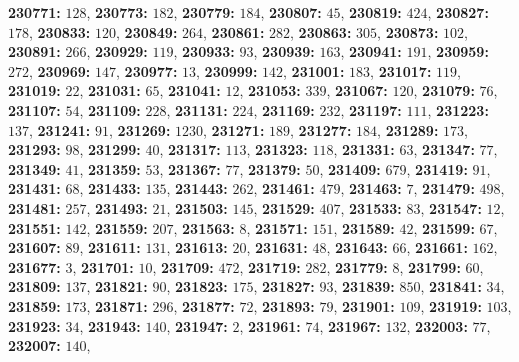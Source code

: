 \textsf{\bfseries 230771:} $128$, \textsf{\bfseries 230773:} $182$, \textsf{\bfseries 230779:} $184$, \textsf{\bfseries 230807:} $45$, \textsf{\bfseries 230819:} $424$, \textsf{\bfseries 230827:} $178$, \textsf{\bfseries 230833:} $120$, \textsf{\bfseries 230849:} $264$, \textsf{\bfseries 230861:} $282$, \textsf{\bfseries 230863:} $305$, \textsf{\bfseries 230873:} $102$, \textsf{\bfseries 230891:} $266$, \textsf{\bfseries 230929:} $119$, \textsf{\bfseries 230933:} $93$, \textsf{\bfseries 230939:} $163$, \textsf{\bfseries 230941:} $191$, \textsf{\bfseries 230959:} $272$, \textsf{\bfseries 230969:} $147$, \textsf{\bfseries 230977:} $13$, \textsf{\bfseries 230999:} $142$, \textsf{\bfseries 231001:} $183$, \textsf{\bfseries 231017:} $119$, \textsf{\bfseries 231019:} $22$, \textsf{\bfseries 231031:} $65$, \textsf{\bfseries 231041:} $12$, \textsf{\bfseries 231053:} $339$, \textsf{\bfseries 231067:} $120$, \textsf{\bfseries 231079:} $76$, \textsf{\bfseries 231107:} $54$, \textsf{\bfseries 231109:} $228$, \textsf{\bfseries 231131:} $224$, \textsf{\bfseries 231169:} $232$, \textsf{\bfseries 231197:} $111$, \textsf{\bfseries 231223:} $137$, \textsf{\bfseries 231241:} $91$, \textsf{\bfseries 231269:} $1230$, \textsf{\bfseries 231271:} $189$, \textsf{\bfseries 231277:} $184$, \textsf{\bfseries 231289:} $173$, \textsf{\bfseries 231293:} $98$, \textsf{\bfseries 231299:} $40$, \textsf{\bfseries 231317:} $113$, \textsf{\bfseries 231323:} $118$, \textsf{\bfseries 231331:} $63$, \textsf{\bfseries 231347:} $77$, \textsf{\bfseries 231349:} $41$, \textsf{\bfseries 231359:} $53$, \textsf{\bfseries 231367:} $77$, \textsf{\bfseries 231379:} $50$, \textsf{\bfseries 231409:} $679$, \textsf{\bfseries 231419:} $91$, \textsf{\bfseries 231431:} $68$, \textsf{\bfseries 231433:} $135$, \textsf{\bfseries 231443:} $262$, \textsf{\bfseries 231461:} $479$, \textsf{\bfseries 231463:} $7$, \textsf{\bfseries 231479:} $498$, \textsf{\bfseries 231481:} $257$, \textsf{\bfseries 231493:} $21$, \textsf{\bfseries 231503:} $145$, \textsf{\bfseries 231529:} $407$, \textsf{\bfseries 231533:} $83$, \textsf{\bfseries 231547:} $12$, \textsf{\bfseries 231551:} $142$, \textsf{\bfseries 231559:} $207$, \textsf{\bfseries 231563:} $8$, \textsf{\bfseries 231571:} $151$, \textsf{\bfseries 231589:} $42$, \textsf{\bfseries 231599:} $67$, \textsf{\bfseries 231607:} $89$, \textsf{\bfseries 231611:} $131$, \textsf{\bfseries 231613:} $20$, \textsf{\bfseries 231631:} $48$, \textsf{\bfseries 231643:} $66$, \textsf{\bfseries 231661:} $162$, \textsf{\bfseries 231677:} $3$, \textsf{\bfseries 231701:} $10$, \textsf{\bfseries 231709:} $472$, \textsf{\bfseries 231719:} $282$, \textsf{\bfseries 231779:} $8$, \textsf{\bfseries 231799:} $60$, \textsf{\bfseries 231809:} $137$, \textsf{\bfseries 231821:} $90$, \textsf{\bfseries 231823:} $175$, \textsf{\bfseries 231827:} $93$, \textsf{\bfseries 231839:} $850$, \textsf{\bfseries 231841:} $34$, \textsf{\bfseries 231859:} $173$, \textsf{\bfseries 231871:} $296$, \textsf{\bfseries 231877:} $72$, \textsf{\bfseries 231893:} $79$, \textsf{\bfseries 231901:} $109$, \textsf{\bfseries 231919:} $103$, \textsf{\bfseries 231923:} $34$, \textsf{\bfseries 231943:} $140$, \textsf{\bfseries 231947:} $2$, \textsf{\bfseries 231961:} $74$, \textsf{\bfseries 231967:} $132$, \textsf{\bfseries 232003:} $77$, \textsf{\bfseries 232007:} $140$, 
